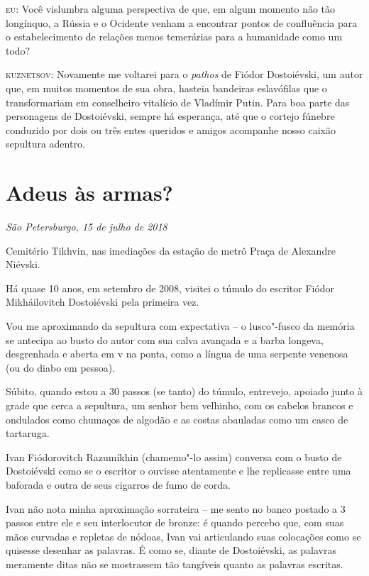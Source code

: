 \textsc{eu:} Você vislumbra alguma perspectiva de que, em algum momento
não tão longínquo, a Rússia e o Ocidente venham a encontrar pontos de
confluência para o estabelecimento de relações menos temerárias para a
humanidade como um todo?

\textsc{kuznetsov:} Novamente me voltarei para o \emph{pathos} de Fiódor
Dostoiévski, um autor que, em muitos momentos de sua obra, hasteia
bandeiras eslavófilas que o transformariam em conselheiro vitalício de
Vladímir Putin. Para boa parte das personagens de Dostoiévski, sempre há
esperança, até que o cortejo fúnebre conduzido por dois ou três entes
queridos e amigos acompanhe nosso caixão sepultura adentro.

\chapter*{Adeus às armas?}

\begin{flushright}
\emph{São Petersburgo, 15 de julho de 2018}
\end{flushright}

Cemitério Tikhvin, nas imediações da estação de metrô Praça de Alexandre
Niévski.

Há quase 10 anos, em setembro de 2008, visitei o túmulo do escritor
Fiódor Mikháilovitch Dostoiévski pela primeira vez.

Vou me aproximando da sepultura com expectativa -- o lusco"-fusco da
memória se antecipa ao busto do autor com sua calva avançada e a barba
longeva, desgrenhada e aberta em v na ponta, como a língua de uma
serpente venenosa (ou do diabo em pessoa).

Súbito, quando estou a 30 passos (se tanto) do túmulo, entrevejo,
apoiado junto à grade que cerca a sepultura, um senhor bem velhinho, com
os cabelos brancos e ondulados como chumaços de algodão e as costas
abauladas como um casco de tartaruga.

Ivan Fiódorovitch Razumíkhin (chamemo"-lo assim) conversa com o busto de
Dostoiévski como se o escritor o ouvisse atentamente e lhe replicasse
entre uma baforada e outra de seus cigarros de fumo de corda.

Ivan não nota minha aproximação sorrateira -- me sento no banco postado
a 3 passos entre ele e seu interlocutor de bronze: é quando percebo que,
com suas mãos curvadas e repletas de nódoas, Ivan vai articulando suas
colocações como se quisesse desenhar as palavras. É como se, diante de
Dostoiévski, as palavras meramente ditas não se mostrassem tão tangíveis
quanto as palavras escritas.

